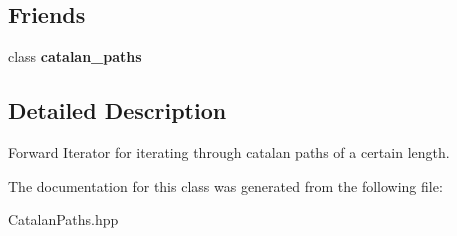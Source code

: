 \subsection*{Friends}
\begin{DoxyCompactItemize}
\item 
\hypertarget{classdis_1_1catalan__paths_1_1iterator_a271bdc1ca5f6381bfa26ee31d7284f28}{class {\bfseries catalan\-\_\-paths}}\label{classdis_1_1catalan__paths_1_1iterator_a271bdc1ca5f6381bfa26ee31d7284f28}

\end{DoxyCompactItemize}


\subsection{Detailed Description}
Forward Iterator for iterating through catalan paths of a certain length. 

The documentation for this class was generated from the following file\-:\begin{DoxyCompactItemize}
\item 
Catalan\-Paths.\-hpp\end{DoxyCompactItemize}
